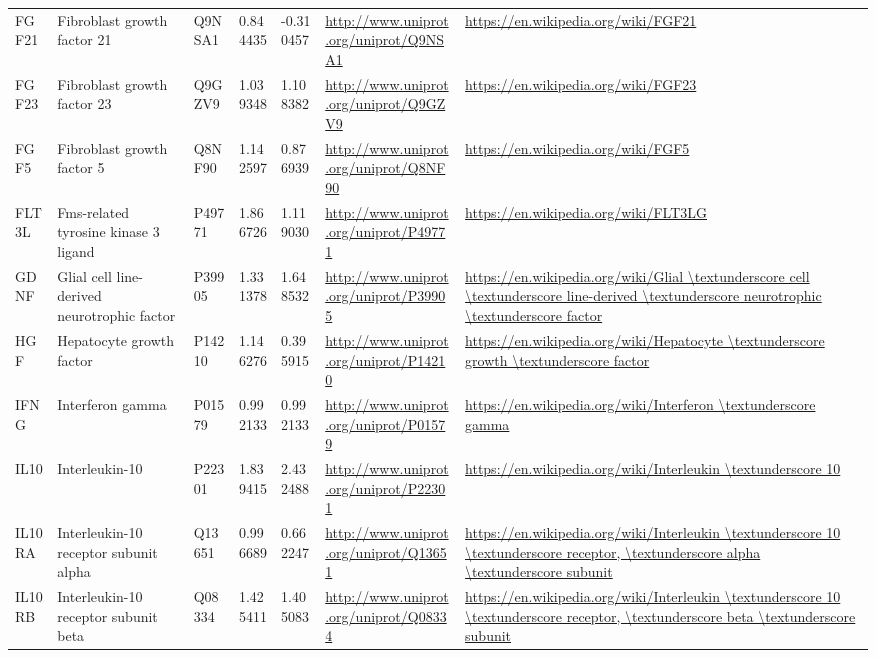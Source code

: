 \begin{table}[H]
\begin{tabular}{ lllllll }
        \multicolumn{1}{l|}{ FGF21 } &  Fibroblast growth factor 21   & Q9NSA1   & 0.844435   & -0.310457   & \url{http://www.uniprot.org/uniprot/Q9NSA1}   & \url{https://en.wikipedia.org/wiki/FGF21}          \\ 
        \multicolumn{1}{l|}{ FGF23 } &  Fibroblast growth factor 23   & Q9GZV9   & 1.039348   & 1.108382   & \url{http://www.uniprot.org/uniprot/Q9GZV9}   & \url{https://en.wikipedia.org/wiki/FGF23}          \\ 
        \multicolumn{1}{l|}{ FGF5 } &  Fibroblast growth factor 5   & Q8NF90   & 1.142597   & 0.876939   & \url{http://www.uniprot.org/uniprot/Q8NF90}   & \url{https://en.wikipedia.org/wiki/FGF5}          \\ 
        \multicolumn{1}{l|}{ FLT3L } &  Fms-related tyrosine kinase 3 ligand   & P49771   & 1.866726   & 1.119030   & \url{http://www.uniprot.org/uniprot/P49771}   & \url{https://en.wikipedia.org/wiki/FLT3LG}          \\ 
        \multicolumn{1}{l|}{ GDNF } &  Glial cell line-derived neurotrophic factor   & P39905   & 1.331378   & 1.648532   & \url{http://www.uniprot.org/uniprot/P39905}   & \url{https://en.wikipedia.org/wiki/Glial \textunderscore cell \textunderscore line-derived \textunderscore neurotrophic \textunderscore factor}          \\ 
        \multicolumn{1}{l|}{ HGF } &  Hepatocyte growth factor   & P14210   & 1.146276   & 0.395915   & \url{http://www.uniprot.org/uniprot/P14210}   & \url{https://en.wikipedia.org/wiki/Hepatocyte \textunderscore growth \textunderscore factor}          \\ 
        \multicolumn{1}{l|}{ IFNG } &  Interferon gamma   & P01579   & 0.992133   & 0.992133   & \url{http://www.uniprot.org/uniprot/P01579}   & \url{https://en.wikipedia.org/wiki/Interferon \textunderscore gamma}          \\ 
        \multicolumn{1}{l|}{ IL10 } &  Interleukin-10   & P22301   & 1.839415   & 2.432488   & \url{http://www.uniprot.org/uniprot/P22301}   & \url{https://en.wikipedia.org/wiki/Interleukin \textunderscore 10}          \\ 
        \multicolumn{1}{l|}{ IL10RA } &  Interleukin-10 receptor subunit alpha   & Q13651   & 0.996689   & 0.662247   & \url{http://www.uniprot.org/uniprot/Q13651}   & \url{https://en.wikipedia.org/wiki/Interleukin \textunderscore 10 \textunderscore receptor, \textunderscore alpha \textunderscore subunit}          \\ 
        \multicolumn{1}{l|}{ IL10RB } &  Interleukin-10 receptor subunit beta   & Q08334   & 1.425411   & 1.405083   & \url{http://www.uniprot.org/uniprot/Q08334}   & \url{https://en.wikipedia.org/wiki/Interleukin \textunderscore 10 \textunderscore receptor, \textunderscore beta \textunderscore subunit}          \\ 

\end{tabular}
\end{table}
